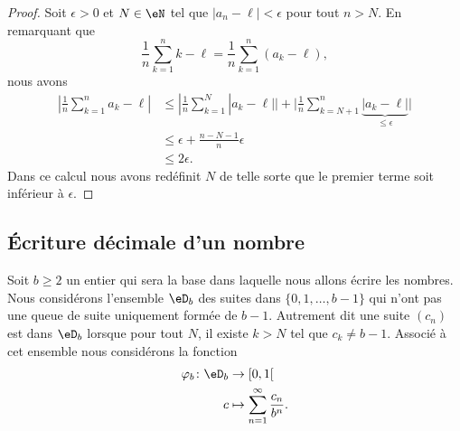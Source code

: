 \begin{proof}
    Soit \( \epsilon>0\) et \( N\in \eN\) tel que \( | a_n-\ell |<\epsilon\) pour tout \( n>N\). En remarquant que
    \begin{equation}
        \frac{1}{ n }\sum_{k=1}^nk-\ell=\frac{1}{ n }\sum_{k=1}^n(a_k-\ell),
    \end{equation}
    nous avons
    \begin{subequations}
        \begin{align}
            | \frac{1}{ n }\sum_{k=1}^na_k-\ell |&\leq| \frac{1}{ n }\sum_{k=1}^N| a_k-\ell | |+\big| \frac{1}{ n }\sum_{k=N+1}^n\underbrace{| a_k-\ell |}_{\leq \epsilon} \big|\\
            &\leq \epsilon+\frac{ n-N-1 }{ n }\epsilon\\
            &\leq 2\epsilon.
        \end{align}
    \end{subequations}
    Dans ce calcul nous avons redéfinit \( N\) de telle sorte que le premier terme soit inférieur à \( \epsilon\).
\end{proof}

\subsection{Écriture décimale d'un nombre}

\begin{normaltext}      \label{NORMALooTZWYooPMgOIm}
    Soit \( b\geq 2\) un entier qui sera la base dans laquelle nous allons écrire les nombres. Nous considérons l'ensemble \( \eD_b\) des suites dans \( \{ 0,1,\ldots, b-1 \}\) qui n'ont pas une queue de suite uniquement formée de \( b-1\). Autrement dit une suite \( (c_n)\) est dans \( \eD_b\) lorsque pour tout \( N\), il existe \( k>N\) tel que \( c_k\neq b-1\). Associé à cet ensemble nous considérons la fonction
    \begin{equation}    \label{EqXXXooOTsCK}
        \begin{aligned}
            \varphi_b\colon \eD_b&\to \mathopen[ 0 , 1 [ \\
                c&\mapsto \sum_{n=1}^{\infty}\frac{ c_n }{ b^n }. 
        \end{aligned}
    \end{equation}
\end{normaltext}

